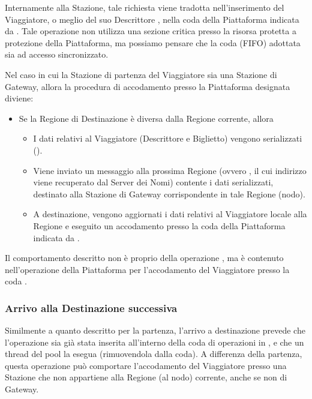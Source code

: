	Internamente alla Stazione, tale richiesta viene tradotta nell'inserimento del Viaggiatore, o meglio del suo Descrittore , nella coda  della Piattaforma indicata da . Tale operazione non utilizza una sezione critica presso la risorsa protetta a protezione della Piattaforma, ma possiamo pensare che la coda (FIFO) adottata sia ad accesso sincronizzato.
	
	Nel caso in cui la Stazione di partenza del Viaggiatore sia una Stazione di Gateway, allora la procedura di accodamento presso la Piattaforma designata diviene:
	\begin{itemize}
		\item Se la Regione di Destinazione  è diversa dalla Regione corrente, allora
			\begin{itemize}
				\item I dati relativi al Viaggiatore (Descrittore e Biglietto) vengono serializzati ().
				\item Viene inviato un messaggio alla prossima Regione (ovvero , il cui indirizzo viene recuperato dal Server dei Nomi) contente i dati serializzati, destinato alla Stazione di Gateway corrispondente in tale Regione (nodo).
				\item A destinazione, vengono aggiornati i dati relativi al Viaggiatore locale alla Regione e eseguito un accodamento presso la coda  della Piattaforma indicata da .
			\end{itemize}
	\end{itemize}
	
	Il comportamento descritto non è proprio della operazione , ma è contenuto nell'operazione della Piattaforma per l'accodamento del Viaggiatore presso la coda . 
	
	
	\subsubsection{Arrivo alla Destinazione successiva}
		
	Similmente a quanto descritto per la partenza, l'arrivo a destinazione prevede che l'operazione  sia già stata inserita all'interno della coda di operazioni in , e che un thread del pool la esegua (rimuovendola dalla coda). A differenza della partenza, questa operazione può comportare l'accodamento del Viaggiatore presso una Stazione che non appartiene alla Regione (al nodo) corrente, anche se non di Gateway. 
	

